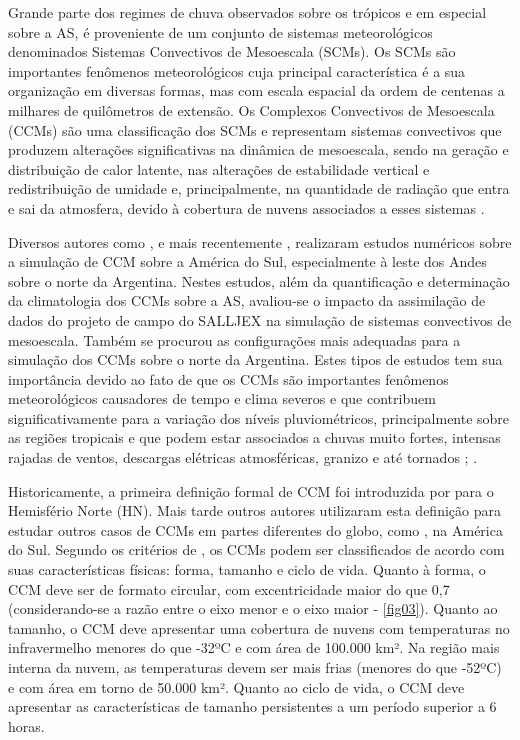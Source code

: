 Grande parte dos regimes de chuva observados sobre os trópicos e em especial sobre a AS, é proveniente de um conjunto de sistemas meteorológicos denominados Sistemas Convectivos de Mesoescala (SCMs). Os SCMs são importantes fenômenos meteorológicos cuja principal característica é a sua organização em diversas formas, mas com escala espacial da ordem de centenas a milhares de quilômetros de extensão. Os Complexos Convectivos de Mesoescala (CCMs) são uma classificação dos SCMs e representam sistemas convectivos que produzem alterações significativas na dinâmica de mesoescala, sendo na geração e distribuição de calor latente, nas alterações de estabilidade vertical e redistribuição de umidade e, principalmente, na quantidade de radiação que entra e sai da atmosfera, devido à cobertura de nuvens associados a esses sistemas \cite{velascofritsch87}.

Diversos autores como ,  e mais recentemente , realizaram estudos numéricos sobre a simulação de CCM sobre a América do Sul, especialmente à leste dos Andes sobre o norte da Argentina. Nestes estudos, além da quantificação e determinação da climatologia dos CCMs sobre a AS, avaliou-se o impacto da assimilação de dados do projeto de campo do SALLJEX na simulação de sistemas convectivos de mesoescala. Também  se procurou as configurações mais adequadas para a simulação dos CCMs sobre o norte da Argentina. Estes tipos de estudos tem sua importância devido ao fato de que os CCMs são importantes fenômenos meteorológicos causadores de tempo e clima severos e que contribuem significativamente para a variação dos níveis pluviométricos, principalmente sobre as regiões tropicais e que podem estar associados a chuvas muito fortes, intensas rajadas de ventos, descargas elétricas atmosféricas, granizo e até tornados \cite{maddox80}; \cite{menezessilvadias04}.

Historicamente, a primeira definição formal de CCM foi introduzida por  para o Hemisfério Norte (HN). Mais tarde outros autores utilizaram esta definição para estudar outros casos de CCMs em partes diferentes do globo, como , na América do Sul. Segundo os critérios de , os CCMs podem ser classificados de acordo com suas características físicas: forma, tamanho e ciclo de vida. Quanto à forma, o CCM deve ser de formato circular, com excentricidade maior do que 0,7 (considerando-se a razão entre o eixo menor e o eixo maior - \autoref{fig03}). Quanto ao tamanho, o CCM deve apresentar uma cobertura de nuvens com temperaturas no infravermelho menores do que -32ºC e com área de 100.000 km². Na região mais interna da nuvem, as temperaturas devem ser mais frias (menores do que -52ºC) e com área em torno de 50.000 km². Quanto ao ciclo de vida, o CCM deve apresentar as características de tamanho persistentes a um período superior a 6 horas.


